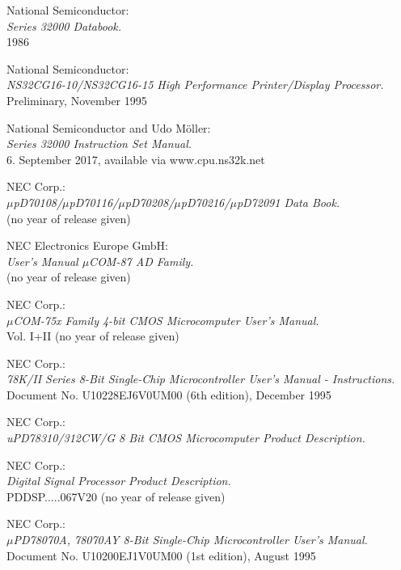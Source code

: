  National Semiconductor: \\
                  {\em Series 32000 Databook.\/} \\
                  1986

 National Semiconductor: \\
                  {\em NS32CG16-10/NS32CG16-15 High Performance Printer/Display Processor.\/} \\
                  Preliminary, November 1995

 National Semiconductor and Udo M\"oller: \\
                  {\em Series 32000 Instruction Set Manual.\/} \\
                  6. September 2017, available via www.cpu.ns32k.net

 NEC Corp.: \\
   	       {\em $\mu$pD70108/$\mu$pD70116/$\mu$pD70208/$\mu$pD70216/$\mu$pD72091 
               Data Book.\/} \\
               (no year of release given)

 NEC Electronics Europe GmbH: \\
                  {\em User's Manual $\mu$COM-87 AD Family.\/} \\
		  (no year of release given)

 NEC Corp.: \\
                {\em $\mu$COM-75x Family 4-bit CMOS Microcomputer User's
                 Manual.\/} \\
                Vol. I+II (no year of release given)

 NEC Corp.: \\
                {\em 78K/II Series 8-Bit Single-Chip Microcontroller
                 User's Manual - Instructions.\/} \\
                Document No. U10228EJ6V0UM00 (6th edition), December 1995

 NEC Corp.: \\
		{\em uPD78310/312CW/G 8 Bit CMOS Microcomputer Product
                 Description.\/}

 NEC Corp.: \\
                {\em Digital Signal Processor Product Description.\/} \\
                PDDSP.....067V20 (no year of release given)

 NEC Corp.: \\
                {\em $\mu$PD78070A, 78070AY 8-Bit Single-Chip Microcontroller
                 User's Manual.\/} \\
                Document No. U10200EJ1V0UM00 (1st edition), August 1995

